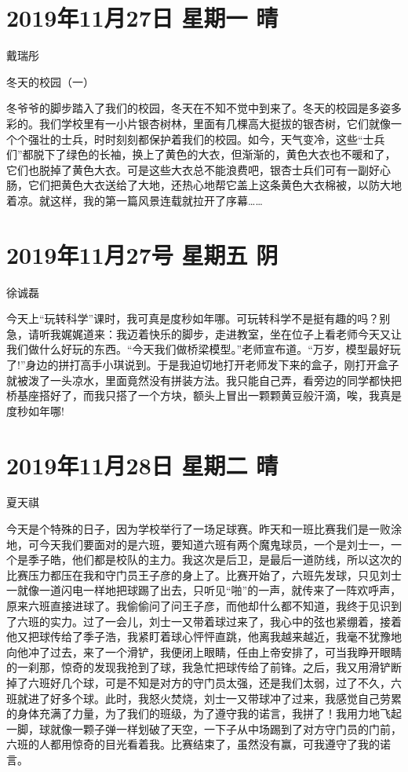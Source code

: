 \section{2019年11月27日 星期一 晴}

戴瑞彤

冬天的校园（一）

冬爷爷的脚步踏入了我们的校园，冬天在不知不觉中到来了。冬天的校园是多姿多彩的。我们学校里有一小片银杏树林，里面有几棵高大挺拔的银杏树，它们就像一个个强壮的士兵，时时刻刻都保护着我们的校园。如今，天气变冷，这些``士兵们''都脱下了绿色的长袖，换上了黄色的大衣，但渐渐的，黄色大衣也不暖和了，它们也脱掉了黄色大衣。可是这些大衣总不能浪费吧，银杏士兵们可有一副好心肠，它们把黄色大衣送给了大地，还热心地帮它盖上这条黄色大衣棉被，以防大地着凉。就这样，我的第一篇风景连载就拉开了序幕\ldots\ldots{}

\section{2019年11月27号 星期五 阴}

徐诚磊

今天上``玩转科学''课时，我可真是度秒如年哪。可玩转科学不是挺有趣的吗？别急，请听我娓娓道来：我迈着快乐的脚步，走进教室，坐在位子上看老师今天又让我们做什么好玩的东西。``今天我们做桥梁模型。''老师宣布道。``万岁，模型最好玩了!''身边的拼打高手小琪说到。于是我迫切地打开老师发下来的盒子，刚打开盒子就被泼了一头凉水，里面竟然没有拼装方法。我只能自己弄，看旁边的同学都快把桥基座搭好了，而我只搭了一个方块，额头上冒出一颗颗黄豆般汗滴，唉，我真是度秒如年哪!

\section{2019年11月28日 星期二 晴}

夏天祺

今天是个特殊的日子，因为学校举行了一场足球赛。昨天和一班比赛我们是一败涂地，可今天我们要面对的是六班，要知道六班有两个魔鬼球员，一个是刘士一，一个是季子皓，他们都是校队的主力。我这次是后卫，是最后一道防线，所以这次的比赛压力都压在我和守门员王子彦的身上了。比赛开始了，六班先发球，只见刘士一就像一道闪电一样地把球踢了出去，只听见``啪''的一声，就传来了一阵欢呼声，原来六班直接进球了。我偷偷问了问王子彦，而他却什么都不知道，我终于见识到了六班的实力。过了一会儿，刘士一又带着球过来了，我心中的弦也紧绷着，接着他又把球传给了季子浩，我紧盯着球心怦怦直跳，他离我越来越近，我毫不犹豫地向他冲了过去，来了一个滑铲，我便闭上眼睛，任由上帝安排了，可当我睁开眼睛的一刹那，惊奇的发现我抢到了球，我急忙把球传给了前锋。之后，我又用滑铲断掉了六班好几个球，可是不知是对方的守门员太强，还是我们太弱，过了不久，六班就进了好多个球。此时，我怒火焚烧，刘士一又带球冲了过来，我感觉自己劳累的身体充满了力量，为了我们的班级，为了遵守我的诺言，我拼了！我用力地飞起一脚，球就像一颗子弹一样划破了天空，一下子从中场踢到了对方守门员的门前，六班的人都用惊奇的目光看着我。比赛结束了，虽然没有赢，可我遵守了我的诺言。

